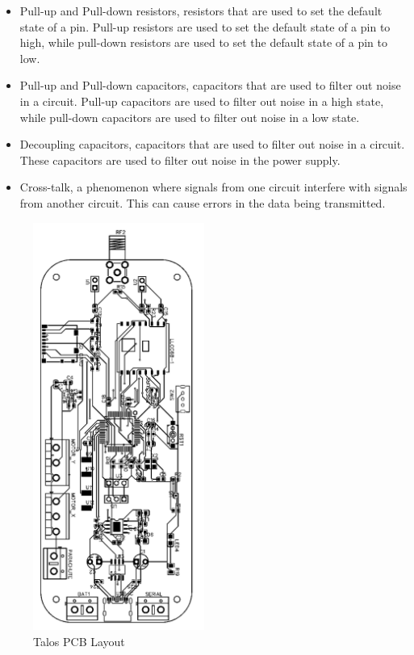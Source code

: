 \documentclass{article}
\begin{document}
\begin{itemize}
      \item Pull-up and Pull-down resistors, resistors that are used to set the default state of a pin. Pull-up resistors are used to set the default state of a pin to high, while pull-down resistors are used to set the default state of a pin to low.
      \item Pull-up and Pull-down capacitors, capacitors that are used to filter out noise in a circuit. Pull-up capacitors are used to filter out noise in a high state, while pull-down capacitors are used to filter out noise in a low state.
      \item Decoupling capacitors, capacitors that are used to filter out noise in a circuit. These capacitors are used to filter out noise in the power supply.
      \item Cross-talk, a phenomenon where signals from one circuit interfere with signals from another circuit. This can cause errors in the data being transmitted.


\end{itemize}
\begin{figure}[h!]
      \caption{Talos PCB Layout}
      \label{fig:talos_pcb_layout}
      \centering
      \includegraphics[width=0.5\textwidth]{PCB.png}
\end{figure}
\end{document}
